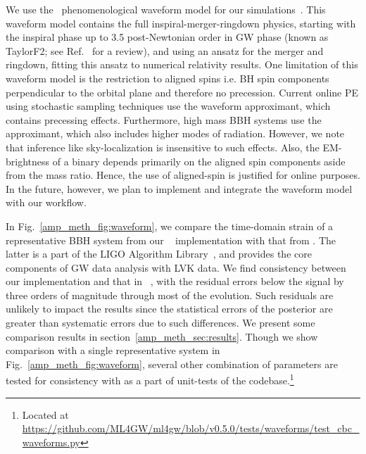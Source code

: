 \begin{refsection}
We use the \phenomd~phenomenological waveform model for our simulations~\cite{Khan:2015jqa}. 
This waveform model contains the full inspiral-merger-ringdown physics, starting with the inspiral phase up to 3.5 post-Newtonian order in GW phase (known as TaylorF2; see Ref.~\cite{Buonanno_2009} for a review), and using an ansatz for the merger and ringdown, fitting this ansatz to numerical relativity results. 
One limitation of this waveform model is the restriction to aligned spins i.e. BH spin components perpendicular to the orbital plane and therefore no precession. 
Current online PE using stochastic sampling techniques use the {\phenomp} waveform approximant, which contains precessing effects. 
Furthermore, high mass BBH systems use the {\phenomxphm} approximant, which also includes higher modes of radiation. 
However, we note that inference like sky-localization is insensitive to such effects. 
Also, the EM-brightness of a binary depends primarily on the aligned spin components aside from the mass ratio. Hence, the use of aligned-spin is justified for online purposes. 
In the future, however, we plan to implement and integrate the {\phenomp} waveform model with our workflow.

In Fig.~\ref{amp_meth_fig:waveform}, we compare the time-domain strain of a representative BBH system from our \phenomd~ implementation with that from \lalsim. 
The latter is a part of the LIGO Algorithm Library~\cite{lalsuite}, and provides the core components of GW data analysis with LVK data. 
We find consistency between our implementation and that in ~\lalsim, with the residual errors below the signal by three orders of magnitude through most of the evolution.
Such residuals are unlikely to impact the results since the statistical errors of the posterior are greater than systematic errors due to such differences. 
We present some comparison results in section~\ref{amp_meth_sec:results}.
Though we show comparison with a single representative system in Fig.~\ref{amp_meth_fig:waveform}, several other combination of parameters are tested for consistency with {\lalsim} as a part of unit-tests of the {\mlgw} codebase.\footnote{\scriptsize{Located at \url{https://github.com/ML4GW/ml4gw/blob/v0.5.0/tests/waveforms/test_cbc_waveforms.py}}}


\end{refsection}
